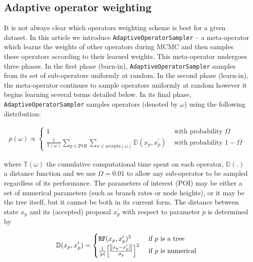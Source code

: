 \documentclass[10pt,letterpaper]{article}
\begin{document}
\clearpage
\subsection*{Adaptive operator weighting}
\label{sect:adaptiveSampling}






It is not always clear which operators weighting scheme is best for a given dataset.
In this article we introduce \texttt{AdaptiveOperatorSampler} -- a meta-operator which learns the weights of other operators during MCMC and then samples these operators according to their learned weights.
This meta-operator undergoes three phases.
In the first phase (burn-in), \texttt{AdaptiveOperatorSampler} samples from its set of sub-operators uniformly at random.
In the second phase (learn-in), the meta-operator continues to sample operators uniformly at random however it begins learning several terms detailed below.
In its final phase, \texttt{AdaptiveOperatorSampler} samples operators (denoted by $\omega$) using the following distribution:


\begin{align}
\label{eqn:adaptiveSampler}
	p(\omega) \propto \begin{cases} 1 & \text{ with probability } \Omega \\ \frac{1}{\mathbb{T}(\omega)} \sum\limits_{p \in \text{POI}}  \sum\limits_{x \in \text{accepts}(\omega)}  \mathbb{D}(x_p, x_p^\prime) & \text{ with probability } 1-\Omega \end{cases}
\end{align}

\noindent
where  $\mathbb{T}(\omega)$ the cumulative computational time spent on each operator, $\mathbb{D}(.)$ a distance function and we use $\Omega = 0.01$ to allow any sub-operator to be sampled regardless of its performance.
The parameters of interest (POI) may be either a set of numerical parameters (such as branch rates or node heights), or it may be the tree itself, but it cannot be both in its current form.
The distance between state $x_p$ and its (accepted) proposal $x_p^\prime$ with respect to parameter $p$ is determined by


\begin{align}
\label{eqn:distanceFunctions} 
	\mathbb{D}(x_p, x_p^\prime) = \begin{cases} \texttt{RF}(x_p, x_p^\prime)^2 & \text{ if } p \text{ is a tree} \\ 
	\frac{1}{|p|} \Big[ \frac{\norm{x_p - x_p^\prime}}{\sigma_p} \Big]^2    & \text{ if } p \text{ is numerical}  \end{cases}
\end{align}
\end{document}
